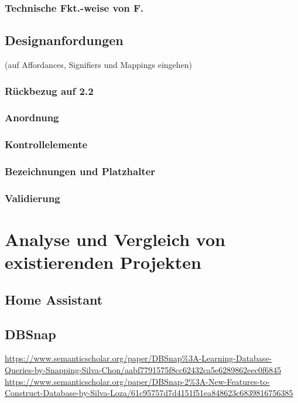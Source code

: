 \documentclass[a4paper, 12pt, oneside, BCOR=1cm,toc=chapterentrywithdots]{scrbook}
\begin{document}
\subsubsection{Technische Fkt.-weise von F.}
\subsection{Designanfordungen}
\cite{normanDesignEveryday2013} (auf Affordances, Signifiers und Mappings eingehen)
\subsubsection{Rückbezug auf 2.2}
\subsubsection{Anordnung}
\subsubsection{Kontrollelemente}
\subsubsection{Bezeichnungen und Platzhalter}
\subsubsection{Validierung}

\clearpage







\clearpage
\section{Analyse und Vergleich von existierenden Projekten}
\subsection{Home Assistant}
\subsection{DBSnap}
\url{https://www.semanticscholar.org/paper/DBSnap\%3A-Learning-Database-Queries-by-Snapping-Silva-Chon/aabf7791575f8cc62432ca5e6289862eec0f6845}
\url{https://www.semanticscholar.org/paper/DBSnap-2\%3A-New-Features-to-Construct-Database-by-Silva-Loza/61c95757d7d4151f51ea848623c6839816756385}
\end{document}
